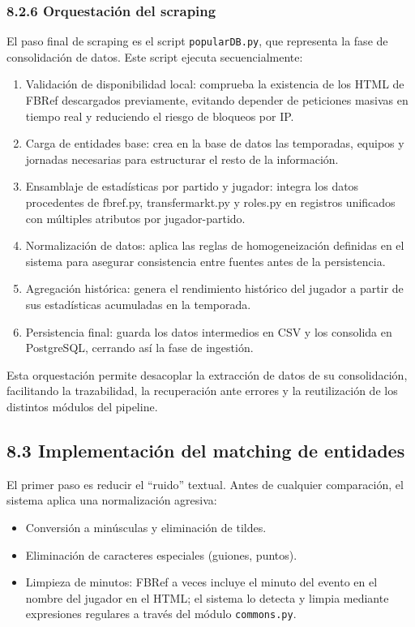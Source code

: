 \subsubsection{8.2.6 Orquestación del scraping}

El paso final de scraping es el script \texttt{popularDB.py}, que representa la fase de consolidación de datos. Este script ejecuta secuencialmente:

\begin{enumerate}
\item Validación de disponibilidad local: comprueba la existencia de los HTML de FBRef descargados previamente, evitando depender de peticiones masivas en tiempo real y reduciendo el riesgo de bloqueos por IP.
\item Carga de entidades base: crea en la base de datos las temporadas, equipos y jornadas necesarias para estructurar el resto de la información.
\item Ensamblaje de estadísticas por partido y jugador: integra los datos procedentes de fbref.py, transfermarkt.py y roles.py en registros unificados con múltiples atributos por jugador-partido.
\item Normalización de datos: aplica las reglas de homogeneización definidas en el sistema para asegurar consistencia entre fuentes antes de la persistencia.
\item Agregación histórica: genera el rendimiento histórico del jugador a partir de sus estadísticas acumuladas en la temporada.
\item Persistencia final: guarda los datos intermedios en CSV y los consolida en PostgreSQL, cerrando así la fase de ingestión.
\end{enumerate}

Esta orquestación permite desacoplar la extracción de datos de su consolidación, facilitando la trazabilidad, la recuperación ante errores y 
la reutilización de los distintos módulos del pipeline.

\subsection{8.3 Implementación del matching de entidades}

El primer paso es reducir el ``ruido'' textual. Antes de cualquier comparación, el sistema aplica una normalización agresiva:

\begin{itemize}
\item Conversión a minúsculas y eliminación de tildes.
\item Eliminación de caracteres especiales (guiones, puntos).
\item Limpieza de minutos: FBRef a veces incluye el minuto del evento en el nombre del jugador en el HTML; el sistema lo detecta y limpia mediante expresiones regulares a través del módulo \texttt{commons.py}.
\end{itemize}

